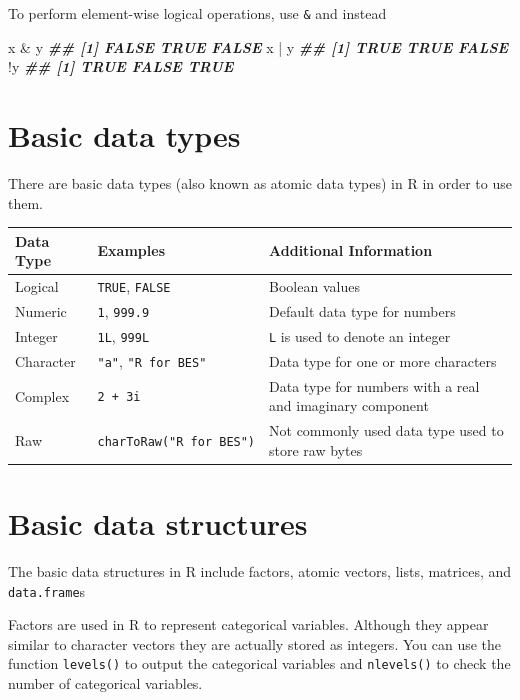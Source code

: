 \documentclass[
]{book}
\newenvironment{Shaded}{\begin{snugshade}}{\end{snugshade}}
\newcommand{\DocumentationTok}[1]{\textcolor[rgb]{0.56,0.35,0.01}{\textbf{\textit{#1}}}}
\newcommand{\NormalTok}[1]{#1}
\newcommand{\SpecialCharTok}[1]{\textcolor[rgb]{0.00,0.00,0.00}{#1}}
\begin{document}
To perform element-wise logical operations, use \texttt{\&} and \texttt{\textbar{}} instead

\begin{Shaded}
\begin{Highlighting}[]
\NormalTok{x }\SpecialCharTok{\&}\NormalTok{ y}
\DocumentationTok{\#\# [1] FALSE  TRUE FALSE}
\NormalTok{x }\SpecialCharTok{|}\NormalTok{ y}
\DocumentationTok{\#\# [1]  TRUE  TRUE FALSE}
\SpecialCharTok{!}\NormalTok{y}
\DocumentationTok{\#\# [1]  TRUE FALSE  TRUE}
\end{Highlighting}
\end{Shaded}

\hypertarget{basic-data-types}{%
\section{Basic data types}\label{basic-data-types}}

There are basic data types (also known as atomic data types) in R in order to use them.

\begin{longtable}[]{@{}lll@{}}
\toprule
Data Type & Examples & Additional Information \\
\midrule
\endhead
Logical & \texttt{TRUE}, \texttt{FALSE} & Boolean values \\
Numeric & \texttt{1}, \texttt{999.9} & Default data type for numbers \\
Integer & \texttt{1L}, \texttt{999L} & \texttt{L} is used to denote an integer \\
Character & \texttt{"a"}, \texttt{"R\ for\ BES"} & Data type for one or more characters \\
Complex & \texttt{2\ +\ 3i} & Data type for numbers with a real and imaginary component \\
Raw & \texttt{charToRaw("R\ for\ BES")} & Not commonly used data type used to store raw bytes \\
\bottomrule
\end{longtable}

\hypertarget{basic-data-structures}{%
\section{Basic data structures}\label{basic-data-structures}}

The basic data structures in R include factors, atomic vectors, lists, matrices, and \texttt{data.frame}s

Factors are used in R to represent categorical variables. Although they appear similar to character vectors they are actually stored as integers. You can use the function \texttt{levels()} to output the categorical variables and \texttt{nlevels()} to check the number of categorical variables.
\end{document}
